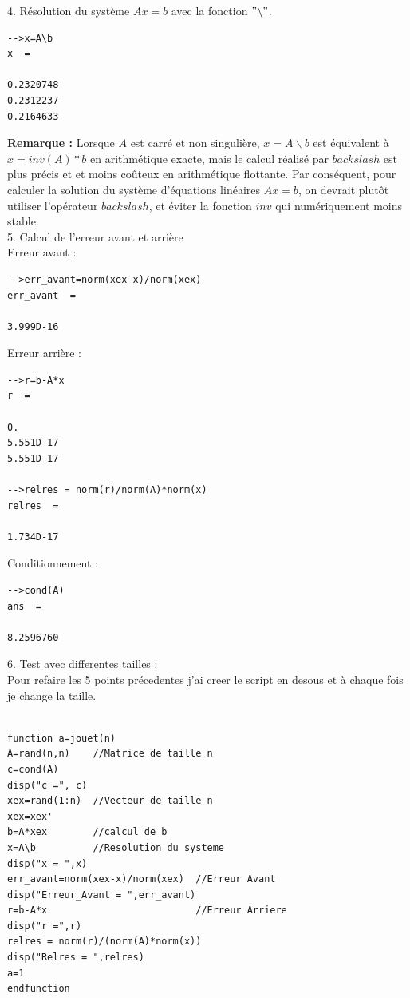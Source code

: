 \documentclass[12pt]{report}
\begin{document}
4. Résolution du système $Ax=b$ avec la fonction $"\backslash"$.
\begin{lstlisting}[]
-->x=A\b
x  = 

0.2320748
0.2312237
0.2164633  
\end{lstlisting}  

\textbf{Remarque :} Lorsque $A$ est carré et non singulière, $x=A\backslash b $ est équivalent à $x=inv(A)*b$ en arithmétique exacte, mais le calcul réalisé par $backslash$ est plus précis et et moins coûteux en arithmétique flottante. Par conséquent, pour calculer la solution du système d'équations linéaires $Ax=b$, on devrait plutôt utiliser l'opérateur $backslash$, et éviter la fonction $inv$ qui numériquement moins stable.\\

5. Calcul de l'erreur avant et arrière \\

Erreur avant :
\begin{lstlisting}[]
-->err_avant=norm(xex-x)/norm(xex)
err_avant  = 

3.999D-16
\end{lstlisting}

Erreur arrière : 
\begin{lstlisting}
-->r=b-A*x
r  = 

0.       
5.551D-17
5.551D-17

-->relres = norm(r)/norm(A)*norm(x)
relres  = 

1.734D-17
\end{lstlisting}

Conditionnement :           
\begin{lstlisting}
-->cond(A)
ans  =

8.2596760 
\end{lstlisting}           
          
6. Test avec differentes tailles :\\

Pour refaire les 5 points précedentes j'ai creer le script en desous et à chaque fois je change la taille.  
\begin{lstlisting}

function a=jouet(n)
A=rand(n,n)    //Matrice de taille n
c=cond(A)
disp("c =", c)
xex=rand(1:n)  //Vecteur de taille n
xex=xex'
b=A*xex        //calcul de b
x=A\b          //Resolution du systeme
disp("x = ",x)
err_avant=norm(xex-x)/norm(xex)  //Erreur Avant
disp("Erreur_Avant = ",err_avant)
r=b-A*x                          //Erreur Arriere
disp("r =",r)
relres = norm(r)/(norm(A)*norm(x))
disp("Relres = ",relres)
a=1
endfunction
\end{lstlisting}     
\end{document}
